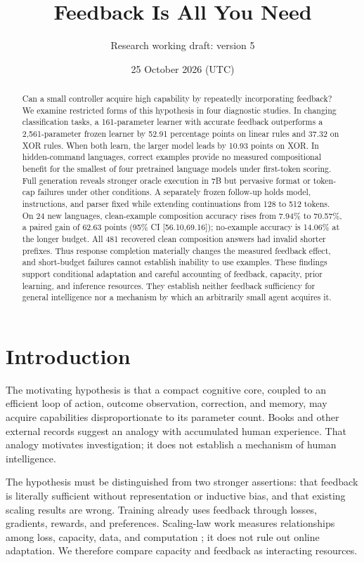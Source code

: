 \documentclass[11pt]{article}
\title{Feedback Is All You Need}
\author{Research working draft: version 5}
\date{25 October 2026 (UTC)}
\begin{document}
\maketitle
\begin{abstract}
Can a small controller acquire high capability by repeatedly incorporating
feedback? We examine restricted forms of this hypothesis in four diagnostic
studies. In changing classification tasks, a 161-parameter learner with
accurate feedback outperforms a 2,561-parameter frozen learner by 52.91
percentage points on linear rules and 37.32 on XOR rules. When both learn,
the larger model leads by 10.93 points on XOR. In hidden-command languages,
correct examples provide no measured compositional benefit for the smallest
of four pretrained language models under first-token scoring. Full generation
reveals stronger oracle execution in 7B but pervasive format or token-cap
failures under other conditions. A separately frozen follow-up holds model,
instructions, and parser fixed while extending continuations from 128 to 512
tokens. On 24 new languages, clean-example composition accuracy rises from
7.94\% to 70.57\%, a paired gain of 62.63 points (95\% CI [56.10,69.16]);
no-example accuracy is 14.06\% at the longer budget. All 481 recovered clean
composition answers had invalid shorter prefixes. Thus response completion
materially changes the measured feedback effect, and short-budget failures
cannot establish inability to use examples. These findings support conditional
adaptation and careful accounting of feedback, capacity, prior learning, and
inference resources. They establish neither feedback sufficiency for general
intelligence nor a mechanism by which an arbitrarily small agent acquires it.
\end{abstract}

\section{Introduction}
The motivating hypothesis is that a compact cognitive core, coupled to an
efficient loop of action, outcome observation, correction, and memory, may
acquire capabilities disproportionate to its parameter count. Books and other
external records suggest an analogy with accumulated human experience. That
analogy motivates investigation; it does not establish a mechanism of human
intelligence.

The hypothesis must be distinguished from two stronger assertions: that
feedback is literally sufficient without representation or inductive bias,
and that existing scaling results are wrong. Training already uses feedback
through losses, gradients, rewards, and preferences. Scaling-law work measures
relationships among loss, capacity, data, and computation \cite{kaplan,hoffmann};
it does not rule out online adaptation. We therefore compare capacity and
feedback as interacting resources.
\end{document}
